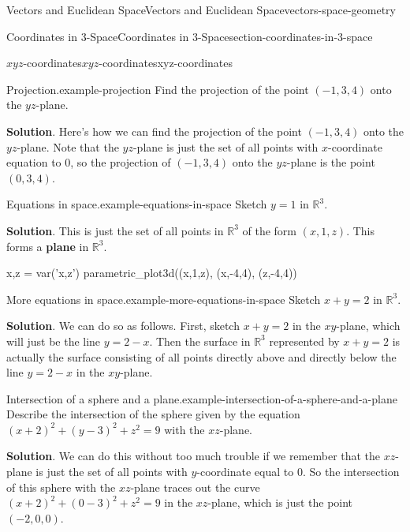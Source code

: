 \documentclass[oneside,10pt,]{book}
\newcommand{\terminology}[1]{\textbf{#1}}
\numberwithin{equation}{section}
\newcommand{\RR}{\mathbb{R}}
\begin{document}
\begin{chapterptx}{Vectors and Euclidean Space}{}{Vectors and Euclidean Space}{}{}{vectors-space-geometry}
\begin{sectionptx}{Coordinates in 3-Space}{}{Coordinates in 3-Space}{}{}{section-coordinates-in-3-space}
\begin{subsectionptx}{\(xyz\)-coordinates}{}{\(xyz\)-coordinates}{}{}{xyz-coordinates}
\begin{example}{Projection.}{example-projection}%
\hypertarget{p-1065}{}%
Find the projection of the point \((-1,3,4)\) onto the \(yz\)-plane.%
\par\smallskip%
\noindent\textbf{Solution}.\hypertarget{solution-204}{}\quad%
\hypertarget{p-1066}{}%
Here's how we can find the projection of the point \((-1,3,4)\) onto the \(yz\)-plane. Note that the \(yz\)-plane is just the set of all points with \(x\)-coordinate equation to \(0\), so the projection of \((-1,3,4)\) onto the \(yz\)-plane is the point \((0,3,4)\).%
\end{example}
\begin{example}{Equations in space.}{example-equations-in-space}%
\hypertarget{p-1067}{}%
Sketch \(y=1\) in \(\RR^{3}\).%
\par\smallskip%
\noindent\textbf{Solution}.\hypertarget{solution-205}{}\quad%
\hypertarget{p-1068}{}%
This is just the set of all points in \(\RR^{3}\) of the form \((x,1,z)\). This forms a \terminology{plane} in \(\RR^{3}\).%
\end{example}
\begin{sageinput}
x,z = var('x,z')
parametric_plot3d((x,1,z), (x,-4,4), (z,-4,4))
\end{sageinput}
\begin{example}{More equations in space.}{example-more-equations-in-space}%
\hypertarget{p-1069}{}%
Sketch \(x+y=2\) in \(\RR^{3}\).%
\par\smallskip%
\noindent\textbf{Solution}.\hypertarget{solution-206}{}\quad%
\hypertarget{p-1070}{}%
We can do so as follows. First, sketch \(x+y=2\) in the \(xy\)-plane, which will just be the line \(y = 2-x\). Then the surface in \(\RR^{3}\) represented by \(x+y=2\) is actually the surface consisting of all points directly above and directly below the line \(y=2-x\) in the \(xy\)-plane.%
\end{example}
\begin{example}{Intersection of a sphere and a plane.}{example-intersection-of-a-sphere-and-a-plane}%
\hypertarget{p-1071}{}%
Describe the intersection of the sphere given by the equation \((x+2)^{2} + (y-3)^{2} + z^{2} = 9\) with the \(xz\)-plane.%
\par\smallskip%
\noindent\textbf{Solution}.\hypertarget{solution-207}{}\quad%
\hypertarget{p-1072}{}%
We can do this without too much trouble if we remember that the \(xz\)-plane is just the set of all points with \(y\)-coordinate equal to \(0\). So the intersection of this sphere with the \(xz\)-plane traces out the curve \((x+2)^{2} + (0-3)^{2} + z^{2} = 9\) in the \(xz\)-plane, which is just the point \((-2,0,0)\).%

\end{example}
\end{subsectionptx}
\end{sectionptx}
\end{chapterptx}
\end{document}
